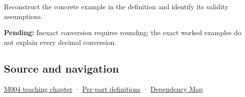 Reconstruct the concrete example in the definition and identify its validity assumptions.

\textbf{Pending:} Inexact conversion requires rounding; the exact worked examples do not explain every decimal conversion.

\subsection{Source and navigation}\label{appendix-6854d0e2218e-source-and-navigation}

\hyperref[01-foundations-i-ch001-a-stretching-ruler-for-real-valued-quantities]{M004 teaching chapter} · \hyperref[appendix-fd090d982a15-m004---parts-61-76]{Per-part definitions} · \hyperref[appendix-4ad47bdd269a]{Dependency Map}
